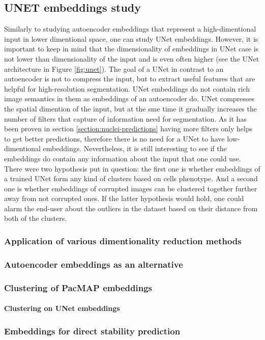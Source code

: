 \subsection{UNET embeddings study}
    Similarly to studying autoencoder embeddings that represent a high-dimentional input in lower dimentional space, one can study UNet embeddings. However, it is important to keep in mind that the dimensionality of embeddings in UNet case is not lower than dimensionality of the input and is even often higher (see the UNet architecture in Figure \ref{fig:unet}). The goal of a UNet in contrast to an autoencoder is not to compress the input, but to extract useful features that are helpful for high-resolution segmentation. UNet embeddings do not contain rich image semantics in them as embeddings of an autoencoder do. UNet compresses the spatial dimention of the input, but at the sme time it gradually increases the number of filters that capture of information need for segmentation. As it has been proven in section \ref{section:nuclei-predictions} having more filters only helps to get better predictions, therefore there is no need for a UNet to have low-dimentional embeddings. Nevertheless, it is still interesting to see if the embeddings do contain any information about the input that one could use. There were two hypothesis put in question: the first one is whether embeddings of a trained UNet form any kind of clusters based on cells phenotype. And a second one is whether embeddings of corrupted images can be clustered together further away from not corrupted ones. If the latter hypothesis would hold, one could alarm the end-user about the outliers in the dataset based on their distance from both of the clusters. 
    \subsubsection{Application of various dimentionality reduction methods}
        \label{section:unet-embeddings-dim-reduction}
        
    \subsubsection{Autoencoder embeddings as an alternative}
        
    \subsubsection{Clustering of PacMAP embeddings}
        \paragraph{Clustering on UNet embeddings}
        \label{section:clustering-on-unet-embeddings}
        
    \subsubsection{Embeddings for direct stability prediction}
        